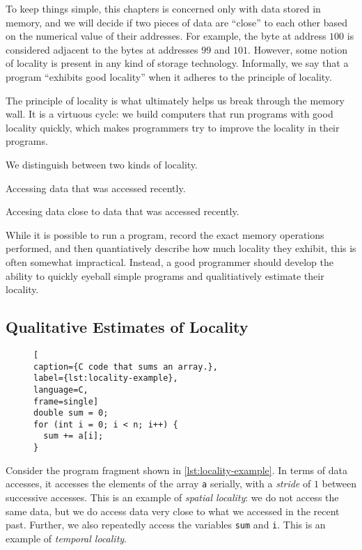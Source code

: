 To keep things simple, this chapters is concerned only with data
stored in memory, and we will decide if two pieces of data are
``close'' to each other based on the numerical value of their
addresses.  For example, the byte at address $100$ is considered
adjacent to the bytes at addresses $99$ and $101$.  However, some
notion of locality is present in any kind of storage technology.
Informally, we say that a program ``exhibits good locality'' when it
adheres to the principle of locality.

The principle of locality is what ultimately helps us break through
the memory wall.  It is a virtuous cycle: we build computers that
run programs with good locality quickly, which makes programmers try
to improve the locality in their programs.

We distinguish between two kinds of locality.

\begin{definition}
  Accessing data that was accessed recently.
\end{definition}

\begin{definition}
  Accesing data close to data that was accessed recently.
\end{definition}

While it is possible to run a program, record the exact memory
operations performed, and then quantiatively describe how much
locality they exhibit, this is often somewhat impractical.  Instead, a
good programmer should develop the ability to quickly eyeball simple
programs and qualitiatively estimate their locality.

\subsection{Qualitative Estimates of Locality}

\begin{figure}
\begin{lstlisting}[
caption={C code that sums an array.},
label={lst:locality-example},
language=C,
frame=single]
double sum = 0;
for (int i = 0; i < n; i++) {
  sum += a[i];
}
\end{lstlisting}
\end{figure}

Consider the program fragment shown in \cref{lst:locality-example}.
In terms of data accesses, it accesses the elements of the array
\texttt{a} serially, with a \emph{stride} of $1$ between successive
accesses.  This is an example of \emph{spatial locality}: we do not
access the same data, but we do access data very close to what we
accessed in the recent past.  Further, we also repeatedly access the
variables \texttt{sum} and \texttt{i}. This is an example of
\emph{temporal locality}.

